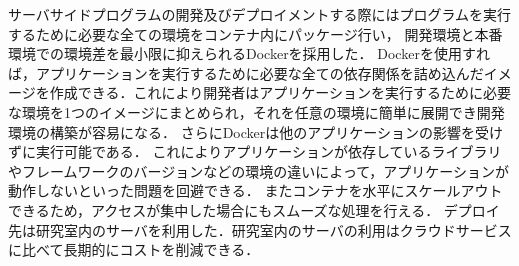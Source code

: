 サーバサイドプログラムの開発及びデプロイメントする際にはプログラムを実行するために必要な全ての環境をコンテナ内にパッケージ行い，
開発環境と本番環境での環境差を最小限に抑えられるDockerを採用した．
Dockerを使用すれば，アプリケーションを実行するために必要な全ての依存関係を詰め込んだイメージを作成できる．これにより開発者はアプリケーションを実行するために必要な環境を1つのイメージにまとめられ，それを任意の環境に簡単に展開でき開発環境の構築が容易になる．
さらにDockerは他のアプリケーションの影響を受けずに実行可能である．
これによりアプリケーションが依存しているライブラリやフレームワークのバージョンなどの環境の違いによって，アプリケーションが動作しないといった問題を回避できる．
またコンテナを水平にスケールアウトできるため，アクセスが集中した場合にもスムーズな処理を行える．
デプロイ先は研究室内のサーバを利用した．研究室内のサーバの利用はクラウドサービスに比べて長期的にコストを削減できる．





